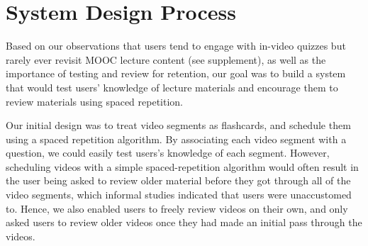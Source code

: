 \documentclass{sigchi}
\begin{document}



\section{System Design Process}

Based on our observations that users tend to engage with in-video quizzes but rarely ever revisit MOOC lecture content (see supplement), as well as the importance of testing and review for retention, our goal was to build a system that would test users' knowledge of lecture materials and encourage them to review materials using spaced repetition.


Our initial design was to treat video segments as flashcards, and schedule them using a spaced repetition algorithm. By associating each video segment with a question, we could easily test users's knowledge of each segment. However, scheduling videos with a simple spaced-repetition algorithm would often result in the user being asked to review older material before they got through all of the video segments, which informal studies indicated that users were unaccustomed to. Hence, we also enabled users to freely review videos on their own, and only asked users to review older videos once they had made an initial pass through the videos. %
\end{document}
